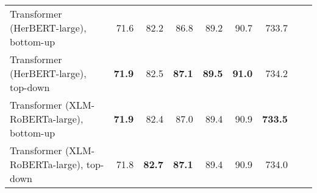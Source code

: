 \begin{table}[ht!]
{\begin{tabular}{lrrrrrrrr}
  Transformer (HerBERT-large), bottom-up & 71.6 & 82.2 & 86.8 & 89.2 & 90.7 & 733.7 \\ 
  Transformer (HerBERT-large), top-down & \textbf{71.9} & 82.5 & \textbf{87.1} & \textbf{89.5} & \textbf{91.0} & 734.2 \\ 
  Transformer (XLM-RoBERTa-large), bottom-up & \textbf{71.9} & 82.4 & 87.0 & 89.4 & 90.9 & \textbf{733.5} \\ 
  Transformer (XLM-RoBERTa-large), top-down & 71.8 & \textbf{82.7} & \textbf{87.1} & 89.4 & 90.9 & 734.0 \\ 
   \hline
\end{tabular}
}
\end{table}




